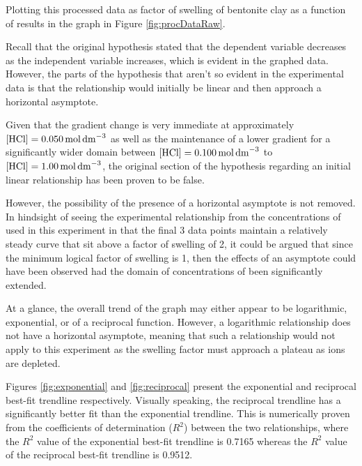 \documentclass[11pt, letterpaper]{article}
\begin{document}
Plotting this processed data as factor of swelling of bentonite clay as a function
of \ce{[HCl]} results in the graph in Figure \ref*{fig:procDataRaw}.



Recall that the original hypothesis stated that the dependent variable
decreases as the independent variable increases,
which is evident in the graphed data. However, the parts of the hypothesis
that aren't so evident in the experimental data is that
the relationship would initially be linear and then approach
a horizontal asymptote.

Given that the gradient change is very immediate at approximately \(\ce{[HCl]} = \SI{0.050}{mol.dm^{-3}}\)
as well as the maintenance of a lower gradient for a significantly wider domain
between \(\ce{[HCl]} = \SI{0.100}{mol.dm^{-3}}\) to \(\ce{[HCl]} = \SI{1.00}{mol.dm^{-3}}\),
the original section of the hypothesis regarding an initial linear relationship
has been proven to be false.

However, the possibility of the presence of a horizontal asymptote is not
removed. In hindsight of seeing the experimental relationship from the concentrations
of  used in this experiment in that the final 3 data points maintain
a relatively steady curve that sit above a factor of swelling of 2,
it could be argued that since the minimum logical factor of swelling is 1, then the effects of an asymptote could have been observed had
the domain of concentrations of  been significantly extended.

At a glance, the overall trend of the graph may either appear to be logarithmic,
exponential, or of a reciprocal function. However, a logarithmic relationship
does not have a horizontal asymptote, meaning that such a relationship would
not apply to this experiment as the swelling factor must approach a plateau
as  ions are depleted.

Figures \ref*{fig:exponential} and \ref*{fig:reciprocal} present the
exponential and reciprocal best-fit trendline respectively.
Visually speaking, the reciprocal trendline has a significantly
better fit than the exponential trendline. This is numerically
proven from the coefficients of determination (\(R^2\)) between the two
relationships, where the \(R^2\) value of the exponential best-fit trendline
is 0.7165 whereas the \(R^2\) value of the reciprocal best-fit trendline
is 0.9512.
\end{document}
